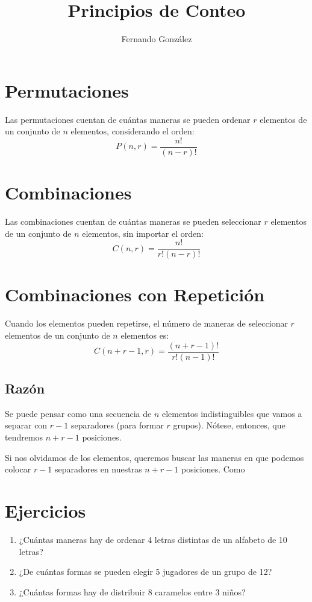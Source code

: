 \documentclass{article}
\begin{document}
	
	\title{Principios de Conteo}
	\author{Fernando González}
	\date{}
	\maketitle
	
	\section{Permutaciones}
	Las permutaciones cuentan de cuántas maneras se pueden ordenar $r$ elementos de un conjunto de $n$ elementos, considerando el orden:
	\begin{equation}
		P(n, r) = \frac{n!}{(n - r)!}
	\end{equation}
	
	\section{Combinaciones}
	Las combinaciones cuentan de cuántas maneras se pueden seleccionar $r$ elementos de un conjunto de $n$ elementos, sin importar el orden:
	\begin{equation}
		C(n, r) = \frac{n!}{r!(n - r)!}
	\end{equation}
	
	\section{Combinaciones con Repetición}
	Cuando los elementos pueden repetirse, el número de maneras de seleccionar $r$ elementos de un conjunto de $n$ elementos es:
	\begin{equation}
		C(n+r-1, r) = \frac{(n+r-1)!}{r!(n-1)!}
	\end{equation}
	
	\subsection{Razón}
	Se puede pensar como una secuencia de $n$ elementos indistinguibles que vamos a separar con $r - 1$ separadores (para formar $r$ grupos). Nótese, entonces, que tendremos $n + r - 1$ posiciones.
	
	Si nos olvidamos de los elementos, queremos buscar las maneras en que podemos colocar $r - 1$ separadores en nuestras $n + r - 1$ posiciones. Como 
	
	\section{Ejercicios}
	\begin{enumerate}
		\item ¿Cuántas maneras hay de ordenar 4 letras distintas de un alfabeto de 10 letras?
		\item ¿De cuántas formas se pueden elegir 5 jugadores de un grupo de 12?
		\item ¿Cuántas formas hay de distribuir 8 caramelos entre 3 niños?
	\end{enumerate}
	
\end{document}
